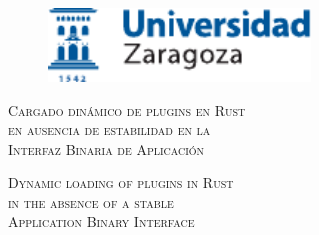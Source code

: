 \documentclass[a4paper,12pt,twoside,hidelinks,openright]{book}
\begin{document}
\begin{titlepage}


\vspace*{-4mm}
\begin{figure}[!h]
  \centering
	\includegraphics[width=69.62mm]{Imagenes/UnizarLogo}
\end{figure}

\vspace*{17mm}

\fontsize{28pt}{28pt}\selectfont
\begin{center}
\setlength{\fboxsep}{3.4mm}
\end{center}

\vspace*{18.7mm}

\fontsize{22pt}{22pt}\selectfont
\begin{center}
\textsc{Cargado dinámico de plugins en Rust\\
en ausencia de estabilidad en la\\
Interfaz Binaria de Aplicación}
\end{center}

\vspace*{0.75cm} 

\fontsize{22pt}{22pt}\selectfont
\begin{center}
\textsc{Dynamic loading of plugins in Rust \\
in the absence of a stable \\
Application Binary Interface}
\end{center}

\vspace*{2cm} 
\baselineskip 36pt
\begin{center}

\fontsize{14pt}{14pt}\selectfont
{}
\vspace*{0mm} 
\fontsize{18pt}{18pt}\selectfont
{}

\baselineskip 36pt

\fontsize{14pt}{14pt}\selectfont
{}
\vspace*{0mm}
\fontsize{15pt}{15pt}\selectfont
{}


\end{center}
\end{titlepage}
\end{document}
